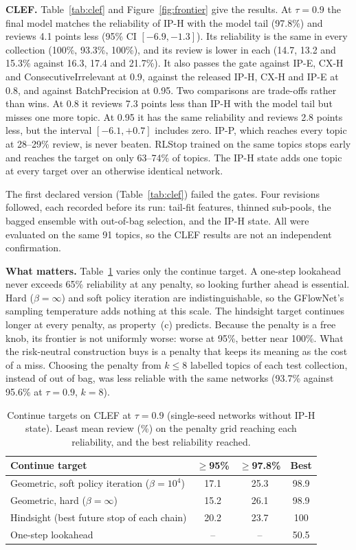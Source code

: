 \documentclass[sigconf,review,anonymous]{acmart}
\begin{document}
\textbf{CLEF.} Table~\ref{tab:clef} and Figure~\ref{fig:frontier} give the results. At $\tau=0.9$ the final model matches the reliability of IP-H with the model tail (97.8\%) and reviews 4.1 points less (95\% CI $[-6.9,-1.3]$). Its reliability is the same in every collection (100\%, 93.3\%, 100\%), and its review is lower in each (14.7, 13.2 and 15.3\% against 16.3, 17.4 and 21.7\%). It also passes the gate against IP-E, CX-H and ConsecutiveIrrelevant at 0.9, against the released IP-H, CX-H and IP-E at 0.8, and against BatchPrecision at 0.95. Two comparisons are trade-offs rather than wins. At 0.8 it reviews 7.3 points less than IP-H with the model tail but misses one more topic. At 0.95 it has the same reliability and reviews 2.8 points less, but the interval $[-6.1,+0.7]$ includes zero. IP-P, which reaches every topic at 28--29\% review, is never beaten. RLStop trained on the same topics stops early and reaches the target on only 63--74\% of topics. The IP-H state adds one topic at every target over an otherwise identical network.

The first declared version (Table~\ref{tab:clef}) failed the gates. Four revisions followed, each recorded before its run: tail-fit features, thinned sub-pools, the bagged ensemble with out-of-bag selection, and the IP-H state. All were evaluated on the same 91 topics, so the CLEF results are not an independent confirmation.

\textbf{What matters.} Table~\ref{tab:ablation} varies only the continue target. A one-step lookahead never exceeds 65\% reliability at any penalty, so looking further ahead is essential. Hard ($\beta=\infty$) and soft policy iteration are indistinguishable, so the GFlowNet's sampling temperature adds nothing at this scale. The hindsight target continues longer at every penalty, as property~(c) predicts. Because the penalty is a free knob, its frontier is not uniformly worse: worse at 95\%, better near 100\%. What the risk-neutral construction buys is a penalty that keeps its meaning as the cost of a miss. Choosing the penalty from $k\le8$ labelled topics of each test collection, instead of out of bag, was less reliable with the same networks (93.7\% against 95.6\% at $\tau=0.9$, $k=8$).

\begin{table}[t]
\caption{Continue targets on CLEF at $\tau=0.9$ (single-seed networks without IP-H state). Least mean review (\%) on the penalty grid reaching each reliability, and the best reliability reached.}
\label{tab:ablation}
\small
\setlength{\tabcolsep}{4pt}
\begin{tabular}{lccc}
\toprule
Continue target & $\ge$95\% & $\ge$97.8\% & Best \\
\midrule
Geometric, soft policy iteration ($\beta{=}10^4$) & 17.1 & 25.3 & 98.9 \\
Geometric, hard ($\beta{=}\infty$) & 15.2 & 26.1 & 98.9 \\
Hindsight (best future stop of each chain) & 20.2 & 23.7 & 100 \\
One-step lookahead & -- & -- & 50.5 \\
\bottomrule
\end{tabular}
\end{table}
\end{document}
